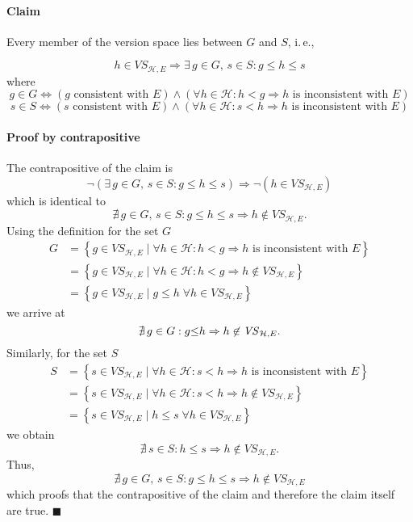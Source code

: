 \paragraph*{Claim}

Every member of the version space lies between $G$ and $S$, i.$\,$e.,

\[
h\in\mathit{VS}_{\mathcal{H},E}\Rightarrow\exists\, g\in G,\, s\in S:g\leq h\leq s
\]
where
\[
g\in G\Leftrightarrow\left(g\text{ consistent with }E\right)\land\left(\forall h\in\mathcal{H}:h<g\Rightarrow h\text{ is inconsistent with }E\right)
\]
\[
s\in S\Leftrightarrow\left(s\text{ consistent with }E\right)\land\left(\forall h\in\mathcal{H}:s<h\Rightarrow h\text{ is inconsistent with }E\right)
\]



\paragraph*{Proof by contrapositive}

The contrapositive of the claim is
\[
\lnot\left(\exists\, g\in G,\, s\in S:g\leq h\leq s\right)\Rightarrow\lnot\left(h\in\mathit{VS}_{\mathcal{H},E}\right)
\]
which is identical to 
\[
\nexists\, g\in G,\, s\in S:g\leq h\leq s\Rightarrow h\not\in\mathit{VS}_{\mathcal{H},E}.
\]
Using the definition for the set $G$
\[
\begin{aligned}G & =\left\{ g\in\mathit{VS}_{\mathcal{H},E}\mid\forall h\in\mathcal{H}:h<g\Rightarrow h\text{ is inconsistent with }E\right\} \\
 & =\left\{ g\in\mathit{VS}_{\mathcal{H},E}\mid\forall h\in\mathcal{H}:h<g\Rightarrow h\not\in\mathit{VS}_{\mathcal{H},E}\right\} \\
 & =\left\{ g\in\mathit{VS}_{\mathcal{H},E}\mid g\leq h\;\forall h\in\mathit{VS}_{\mathcal{H},E}\right\} 
\end{aligned}
\]
we arrive at 
\[
\nexists\, g\in G:g\text{\ensuremath{\leq}}h\Rightarrow h\not\in\mathit{VS}_{\mathcal{H},E}.
\]
Similarly, for the set $S$
\[
\begin{aligned}S & =\left\{ s\in\mathit{VS}_{\mathcal{H},E}\mid\forall h\in\mathcal{H}:s<h\Rightarrow h\text{ is inconsistent with }E\right\} \\
 & =\left\{ s\in\mathit{VS}_{\mathcal{H},E}\mid\forall h\in\mathcal{H}:s<h\Rightarrow h\not\in\mathit{VS}_{\mathcal{H},E}\right\} \\
 & =\left\{ s\in\mathit{VS}_{\mathcal{H},E}\mid h\leq s\;\forall h\in\mathit{VS}_{\mathcal{H},E}\right\} 
\end{aligned}
\]
we obtain
\[
\nexists\, s\in S:h\leq s\Rightarrow h\not\in\mathit{VS}_{\mathcal{H},E}.
\]
Thus, 
\[
\nexists\, g\in G,\, s\in S:g\leq h\leq s\Rightarrow h\not\in\mathit{VS}_{\mathcal{H},E}
\]
 which proofs that the contrapositive of the claim and therefore the
claim itself are true. \newline \phantom{x}\hfill $\blacksquare$
